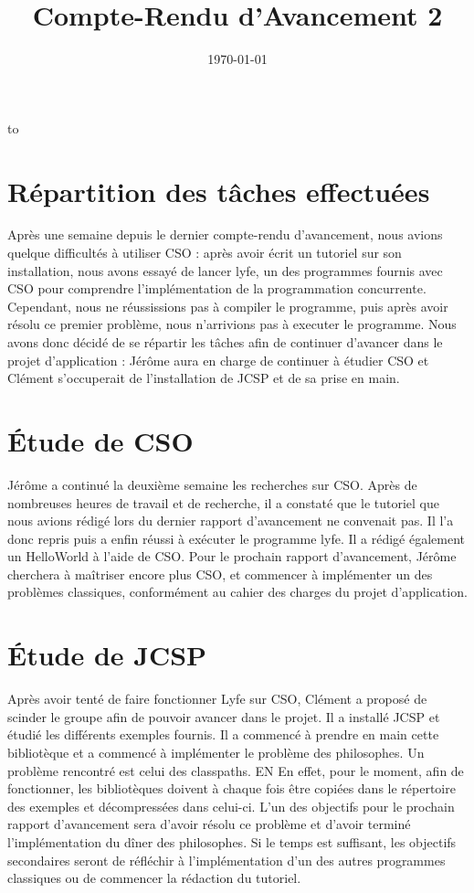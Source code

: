 \documentclass[a4paper,11pt]{article}
\date{\today}
\title{Compte-Rendu d'Avancement 2}
\makeatletter
\def\clap#1{\hbox to 0pt{\hss #1\hss}} %
\def\ligne#1{\hbox to \hsize{\vbox{\centering #1}}} %
\def\haut#1#2#3{\hbox to \hsize{\rlap{\vtop{\raggedright #1}}\hss \clap{\vtop{\centering #2}} \hss \llap{\vtop{\raggedleft #3}}}}%
\def\bas#1#2#3{\hbox to \hsize{\rlap{\vbox{\raggedright #1}} \hss \clap{\vbox{\centering #2}} \hss \llap{\vbox{\raggedleft #3}}}}%
\def\maketitle{%
	  \thispagestyle{empty}\vbox to \vsize{%
		\vspace{5mm} \ligne{\Huge \@title}
		\vspace{1cm} \haut{Supervisé par \@supervisor}{}{\@follower}
		\vspace{3mm}\hrule
		\vfill
		\bas{}{\@location, \@date}{}
		}%
	  \cleardoublepage
	  }
\makeatother
\begin{document}
\maketitle

\section{Répartition des tâches effectuées}

Après une semaine depuis le dernier compte-rendu d'avancement, nous avions quelque difficultés à utiliser CSO : après avoir écrit un tutoriel sur son installation, nous avons essayé de lancer lyfe, un des programmes fournis avec CSO pour comprendre l'implémentation de la programmation concurrente.
Cependant, nous ne réussissions pas à compiler le programme, puis après avoir résolu ce premier problème, nous n'arrivions pas à executer le programme. Nous avons donc décidé de se répartir les tâches afin de continuer d'avancer dans le projet d'application : Jérôme aura en charge de continuer à étudier CSO et Clément s'occuperait de l'installation de JCSP et de sa prise en main.

\section{\'{E}tude de CSO}

Jérôme a continué la deuxième semaine les recherches sur CSO. Après de nombreuses heures de travail et de recherche, il a constaté que le tutoriel que nous avions rédigé lors du dernier rapport d'avancement ne convenait pas. Il l'a donc repris puis a enfin réussi à exécuter le programme lyfe. Il a rédigé également un HelloWorld à l'aide de CSO. Pour le prochain rapport d'avancement, Jérôme cherchera à maîtriser encore plus CSO, et commencer à implémenter un des problèmes classiques, conformément au cahier des charges du projet d'application.

\section{\'{E}tude de JCSP}

Après avoir tenté de faire fonctionner Lyfe sur CSO, Clément a proposé de scinder le groupe afin de pouvoir avancer dans le projet. Il a installé JCSP et étudié les différents exemples fournis. Il a commencé à prendre en main cette bibliotèque et a commencé à implémenter le problème des philosophes. Un problème rencontré est celui des classpaths. EN En effet, pour le moment, afin de fonctionner, les bibliotèques doivent à chaque fois être copiées dans le répertoire des exemples et décompressées dans celui-ci. L'un des objectifs pour le prochain rapport d'avancement sera d'avoir résolu ce problème et d'avoir terminé l'implémentation du dîner des philosophes. Si le temps est suffisant, les objectifs secondaires seront de réfléchir à l'implémentation d'un des autres programmes classiques ou de commencer la rédaction du tutoriel.
\end{document}
